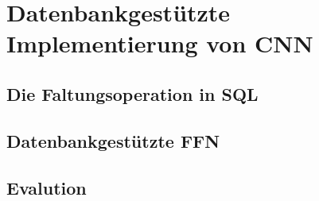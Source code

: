\chapter{Datenbankgestützte Implementierung von CNN}

\section{Die Faltungsoperation in SQL}

\section{Datenbankgestützte FFN}

\section{Evalution}
